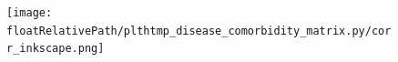 %
%

\begin{figure}[!ht]
    \centering
    \texttt{[image: \\floatRelativePath/plthtmp\_disease\_comorbidity\_matrix.py/corr\_inkscape.png]}
    \caption{}
\end{figure}

%
%


%
%

